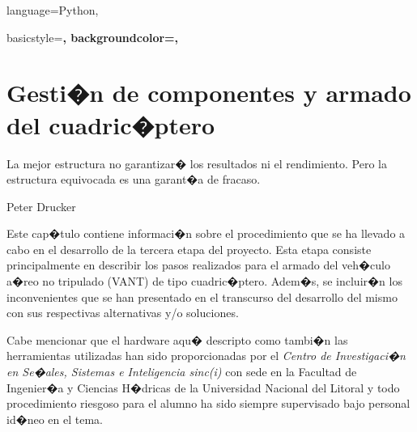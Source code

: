 {language=Python,
}



{basicstyle=\scriptsize\bf\ttfamily,
	backgroundcolor=\color{gray75},
}




\chapter{Gesti�n de componentes y armado del cuadric�ptero}
\label{cap2:gest_y_arm}

\begin{FraseCelebre}
	
	\begin{Frase}
	 La mejor estructura no garantizar� los resultados ni el rendimiento.
	 Pero la estructura equivocada es una garant�a de fracaso.
	\end{Frase}

	\begin{Fuente}
		Peter Drucker
	\end{Fuente}

\end{FraseCelebre}

\begin{resumen}
Este cap�tulo contiene informaci�n sobre el procedimiento que se ha llevado a cabo en el desarrollo de la tercera etapa del proyecto. Esta etapa consiste principalmente en describir los pasos realizados para el armado del veh�culo a�reo no tripulado (VANT) de tipo cuadric�ptero. Adem�s, se incluir�n los inconvenientes que se han presentado en el transcurso del desarrollo del mismo con sus respectivas alternativas y/o soluciones. 

\par Cabe mencionar que el hardware aqu� descripto como tambi�n las herramientas utilizadas han sido proporcionadas por el\textit{ Centro de Investigaci�n en Se�ales, Sistemas e Inteligencia sinc(i)} con sede en la Facultad de Ingenier�a y Ciencias H�dricas de la Universidad Nacional del Litoral y todo procedimiento riesgoso para el alumno ha sido siempre supervisado bajo personal id�neo en el tema.

\end{resumen}

